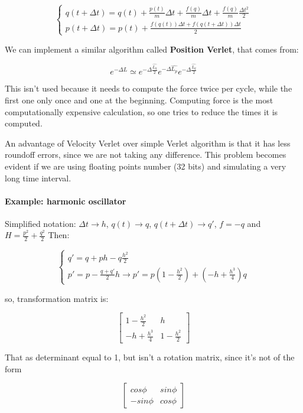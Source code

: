 \documentclass[a4paper, italian, openany]{book}
\begin{document}
$$\begin{cases}
q(t + \Delta t) = q(t) + \frac{p(t)}{m} \Delta t + \frac{f(q)}{m}\Delta t + \frac{f(q)}{m} \frac{\Delta t^2}{2}\\
p(t+ \Delta t) = p(t) + \frac{f(q(t))\Delta t + f(q(t+\Delta t))\Delta t}{2}
\end{cases}$$

We can implement a similar algorithm called \textbf{Position Verlet}, that comes from:

$$e^{-\Delta \hat{L}} \simeq e^{-\Delta \frac{\hat{L_q}}{2}} e^{-\Delta \hat{L_p}} e^{-\Delta \frac{\hat{L_q}}{2}}$$

This isn't used because it needs to compute the force twice per cycle, while the first one only once and one at the beginning. Computing force is the most computationally expensive calculation, so one tries to reduce the times it is computed.

An advantage of Velocity Verlet over simple Verlet algorithm is that it has less roundoff errors, since we are not taking any difference. This problem becomes evident if we are using floating points number (32 bits) and simulating a very long time interval.

\paragraph{Example: harmonic oscillator}

Simplified notation: $\Delta t \to h$, $q(t) \to q$, $q(t + \Delta t) \to q'$, $f = -q$ and $H= \frac{p^2}{2} + \frac{q^2}{2}$\newline
Then:

$$\begin{cases}
q' = q +ph - q \frac{h^2}{2}\\
p' = p - \frac{q+q'}{2}h \to p' = p(1-\frac{h^2}{2}) + (-h +\frac{h^3}{4})q
\end{cases}$$

so, transformation matrix is:

$$\begin{bmatrix} 1-\frac{h^2}{2} & h \\
-h +\frac{h^3}{4} & 1-\frac{h^2}{2}
\end{bmatrix}
$$

That as determinant equal to 1, but isn't a rotation matrix, since it's not of the form

$$\begin{bmatrix} cos\phi & sin\phi \\
-sin\phi & cos\phi
\end{bmatrix}
$$
\end{document}
